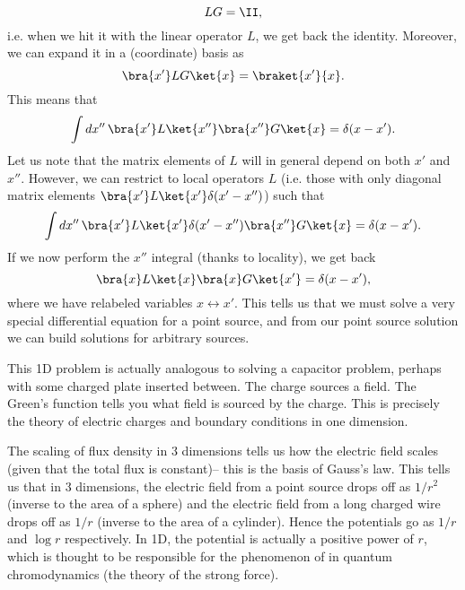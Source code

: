 \begin{equation}
    LG= \II,
\end{equation}
i.e. when we hit it with the linear operator $L$, we get back the identity. Moreover, we can expand it in a (coordinate) basis as
\begin{equation}
    \bra{x'} LG \ket{x} = \braket{x'}{x}.
\end{equation}
This means that
\begin{equation}
    \int dx''\,\bra{x'}L \ket{x''}\bra{x''} G\ket{x} = \delta(x-x').
\end{equation}
Let us note that the matrix elements of $L$ will in general depend on both $x'$ and $x''$. However, we can restrict to local operators $L$ (i.e. those with only diagonal matrix elements $\bra{x'} L \ket{x'} \delta(x'-x'')$) such that
\begin{equation}
    \int dx''\,\bra{x'}L \ket{x'} \delta(x'-x'') \bra{x''}G\ket{x} = \delta(x-x').
\end{equation}
If we now perform the $x''$ integral (thanks to locality), we get back
\begin{equation}
    \bra{x}L \ket{x} \bra{x} G \ket{x'} = \delta(x-x'),
\end{equation}
where we have relabeled variables $x\leftrightarrow x'$. This tells us that we must solve a very special differential equation for a point source, and from our point source solution we can build solutions for arbitrary sources.

This 1D problem is actually analogous to solving a capacitor problem, perhaps with some charged plate inserted between. The charge sources a field. The Green's function tells you what field is sourced by the charge. This is precisely the theory of electric charges and boundary conditions in one dimension.

The scaling of flux density in 3 dimensions tells us how the electric field scales (given that the total flux is constant)-- this is the basis of Gauss's law. This tells us that in 3 dimensions, the electric field from a point source drops off as $1/r^2$ (inverse to the area of a sphere) and the electric field from a long charged wire drops off as $1/r$ (inverse to the area of a cylinder). Hence the potentials go as $1/r$ and $\log r$ respectively. In 1D, the potential is actually a positive power of $r$, which is thought to be responsible for the phenomenon of  in quantum chromodynamics (the theory of the strong force).

